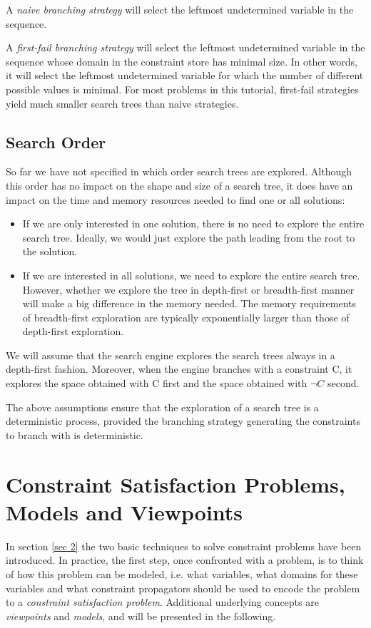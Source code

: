 \documentclass[a4paper,halfparskip]{scrartcl}
\begin{document}
A \emph{naive branching strategy} will select the 
leftmost undetermined variable in the sequence.

A \emph{first-fail branching strategy} will select 
the leftmost undetermined variable in the 
sequence whose domain in the constraint store has minimal 
size. In other words, it will select 
the leftmost undetermined variable for which the number 
of different possible values is minimal.
For most problems in this tutorial,
first-fail strategies yield much smaller 
search trees than naive strategies.

\subsection{Search Order}
So far we have not specified in which order search trees 
are explored. Although this order 
has no impact on the shape and size of a search tree, 
it does have an impact on the time and
 memory resources needed to find one or all solutions:
\begin{itemize}
\item
If we are only interested in one solution, there is no 
need to explore the entire search tree. 
Ideally, we would just explore the path leading from the 
root to the solution.
\item
If we are interested in all solutions, we need to explore 
the entire search tree. However, 
whether we explore the tree in depth-first or breadth-first 
manner will make a big difference 
in the memory needed. The memory requirements of breadth-first 
exploration are typically 
exponentially larger than those of depth-first exploration.
\end{itemize}
We will assume that the search engine explores the search 
trees always in a depth-first fashion. 
Moreover, when the engine branches with a constraint C, 
it explores the space obtained with C 
first and the space obtained with $ \neg C$ second.

The above assumptions ensure that the exploration of a 
search tree is a deterministic process, 
provided the branching strategy generating the 
constraints to branch with is deterministic.



\newpage
\section{Constraint Satisfaction Problems, Models and Viewpoints}
In section \ref{sec 2} the two basic techniques to solve
constraint problems have been introduced. In practice, 
the first step, once confronted with a problem, is to think
of how this problem can be modeled, i.e. what variables, what
domains for these variables and what constraint propagators
should be used to encode the problem to a \emph{constraint
satisfaction problem}. Additional underlying concepts
are \emph{viewpoints} and \emph{models}, and will be 
presented in the following.
\end{document}
